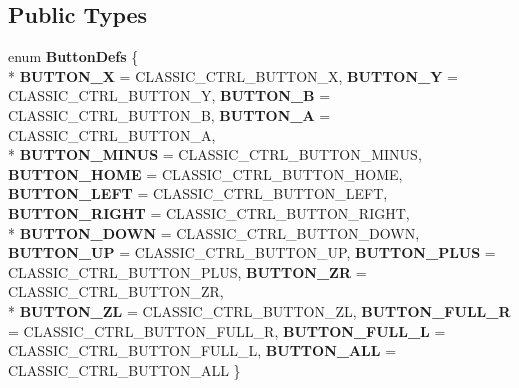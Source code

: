 \subsection*{Public Types}
\begin{DoxyCompactItemize}
\item 
enum {\bfseries Button\-Defs} \{ \\*
{\bfseries B\-U\-T\-T\-O\-N\-\_\-\-X} =  C\-L\-A\-S\-S\-I\-C\-\_\-\-C\-T\-R\-L\-\_\-\-B\-U\-T\-T\-O\-N\-\_\-\-X, 
{\bfseries B\-U\-T\-T\-O\-N\-\_\-\-Y} =  C\-L\-A\-S\-S\-I\-C\-\_\-\-C\-T\-R\-L\-\_\-\-B\-U\-T\-T\-O\-N\-\_\-\-Y, 
{\bfseries B\-U\-T\-T\-O\-N\-\_\-\-B} =  C\-L\-A\-S\-S\-I\-C\-\_\-\-C\-T\-R\-L\-\_\-\-B\-U\-T\-T\-O\-N\-\_\-\-B, 
{\bfseries B\-U\-T\-T\-O\-N\-\_\-\-A} =  C\-L\-A\-S\-S\-I\-C\-\_\-\-C\-T\-R\-L\-\_\-\-B\-U\-T\-T\-O\-N\-\_\-\-A, 
\\*
{\bfseries B\-U\-T\-T\-O\-N\-\_\-\-M\-I\-N\-U\-S} =  C\-L\-A\-S\-S\-I\-C\-\_\-\-C\-T\-R\-L\-\_\-\-B\-U\-T\-T\-O\-N\-\_\-\-M\-I\-N\-U\-S, 
{\bfseries B\-U\-T\-T\-O\-N\-\_\-\-H\-O\-M\-E} =  C\-L\-A\-S\-S\-I\-C\-\_\-\-C\-T\-R\-L\-\_\-\-B\-U\-T\-T\-O\-N\-\_\-\-H\-O\-M\-E, 
{\bfseries B\-U\-T\-T\-O\-N\-\_\-\-L\-E\-F\-T} =  C\-L\-A\-S\-S\-I\-C\-\_\-\-C\-T\-R\-L\-\_\-\-B\-U\-T\-T\-O\-N\-\_\-\-L\-E\-F\-T, 
{\bfseries B\-U\-T\-T\-O\-N\-\_\-\-R\-I\-G\-H\-T} =  C\-L\-A\-S\-S\-I\-C\-\_\-\-C\-T\-R\-L\-\_\-\-B\-U\-T\-T\-O\-N\-\_\-\-R\-I\-G\-H\-T, 
\\*
{\bfseries B\-U\-T\-T\-O\-N\-\_\-\-D\-O\-W\-N} =  C\-L\-A\-S\-S\-I\-C\-\_\-\-C\-T\-R\-L\-\_\-\-B\-U\-T\-T\-O\-N\-\_\-\-D\-O\-W\-N, 
{\bfseries B\-U\-T\-T\-O\-N\-\_\-\-U\-P} =  C\-L\-A\-S\-S\-I\-C\-\_\-\-C\-T\-R\-L\-\_\-\-B\-U\-T\-T\-O\-N\-\_\-\-U\-P, 
{\bfseries B\-U\-T\-T\-O\-N\-\_\-\-P\-L\-U\-S} =  C\-L\-A\-S\-S\-I\-C\-\_\-\-C\-T\-R\-L\-\_\-\-B\-U\-T\-T\-O\-N\-\_\-\-P\-L\-U\-S, 
{\bfseries B\-U\-T\-T\-O\-N\-\_\-\-Z\-R} =  C\-L\-A\-S\-S\-I\-C\-\_\-\-C\-T\-R\-L\-\_\-\-B\-U\-T\-T\-O\-N\-\_\-\-Z\-R, 
\\*
{\bfseries B\-U\-T\-T\-O\-N\-\_\-\-Z\-L} =  C\-L\-A\-S\-S\-I\-C\-\_\-\-C\-T\-R\-L\-\_\-\-B\-U\-T\-T\-O\-N\-\_\-\-Z\-L, 
{\bfseries B\-U\-T\-T\-O\-N\-\_\-\-F\-U\-L\-L\-\_\-\-R} =  C\-L\-A\-S\-S\-I\-C\-\_\-\-C\-T\-R\-L\-\_\-\-B\-U\-T\-T\-O\-N\-\_\-\-F\-U\-L\-L\-\_\-\-R, 
{\bfseries B\-U\-T\-T\-O\-N\-\_\-\-F\-U\-L\-L\-\_\-\-L} =  C\-L\-A\-S\-S\-I\-C\-\_\-\-C\-T\-R\-L\-\_\-\-B\-U\-T\-T\-O\-N\-\_\-\-F\-U\-L\-L\-\_\-\-L, 
{\bfseries B\-U\-T\-T\-O\-N\-\_\-\-A\-L\-L} =  C\-L\-A\-S\-S\-I\-C\-\_\-\-C\-T\-R\-L\-\_\-\-B\-U\-T\-T\-O\-N\-\_\-\-A\-L\-L
 \}
\end{DoxyCompactItemize}
